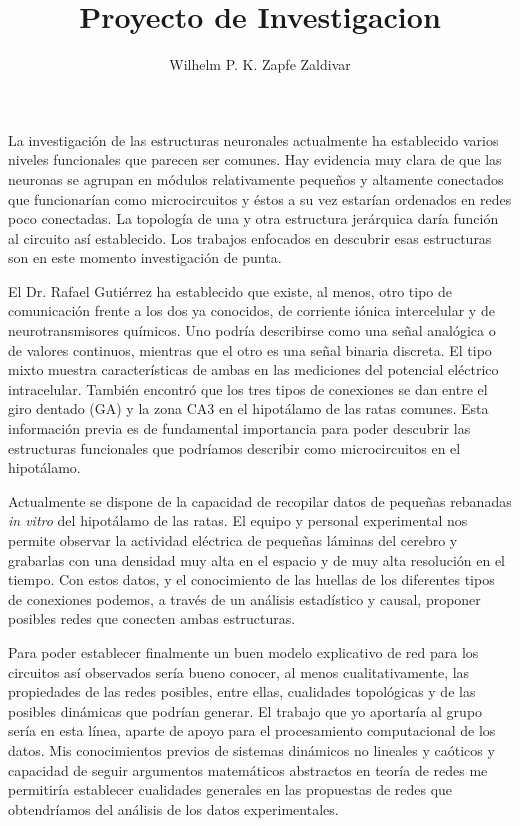 \documentclass[letterpaper, 10pt]{article}
\title{Proyecto de Investigacion}
\author{Wilhelm P. K. Zapfe Zaldivar}
\begin{document}
\maketitle

La investigación de las estructuras neuronales actualmente
ha establecido varios niveles funcionales que parecen ser
comunes. Hay evidencia muy clara de que las neuronas se agrupan
en módulos relativamente pequeños y altamente conectados que funcionarían
como microcircuitos y éstos a su vez estarían ordenados
en redes poco conectadas. La topología de una y otra
estructura jerárquica daría función al circuito así establecido.
Los trabajos enfocados en descubrir esas estructuras son
en este momento investigación de punta.

El Dr. Rafael Gutiérrez ha establecido que existe, al menos, otro
tipo de comunicación frente a los dos ya conocidos, de corriente iónica
intercelular y de neurotransmisores químicos. Uno podría describirse como
una señal analógica o de valores continuos, mientras que el otro
es una señal binaria discreta. El tipo mixto muestra características
de ambas en las mediciones del potencial eléctrico intracelular. También
encontró    que los tres tipos de conexiones se dan entre el giro dentado
(GA) y la zona CA3 en el hipotálamo de las ratas comunes. Esta
información previa es de fundamental importancia para
poder descubrir las estructuras funcionales que podríamos
describir como microcircuitos en el hipotálamo.

Actualmente se dispone de la capacidad de recopilar datos de pequeñas
rebanadas \emph{in vitro} del hipotálamo de las ratas. El equipo y personal
experimental nos permite observar la actividad eléctrica de pequeñas 
láminas del cerebro y grabarlas con una densidad muy alta en el espacio y de
muy alta resolución en el tiempo. Con estos datos, y el conocimiento
de las huellas de los diferentes tipos de conexiones podemos, a través
de un análisis estadístico y causal, proponer posibles redes que
conecten ambas estructuras. 

Para poder establecer finalmente un buen modelo explicativo de red para
los circuitos así observados sería bueno conocer, al menos cualitativamente,
las propiedades de las redes posibles, entre ellas, cualidades topológicas
y de las posibles dinámicas que podrían generar. El trabajo que yo aportaría
al grupo sería en esta línea, aparte de apoyo para el procesamiento
computacional de los datos. Mis conocimientos previos
de sistemas dinámicos no lineales y caóticos y capacidad de seguir
argumentos matemáticos abstractos en teoría de redes me permitiría
establecer cualidades generales en las propuestas de redes que obtendríamos
del análisis de los datos experimentales.
\end{document}
